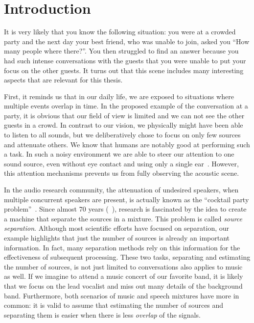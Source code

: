 \chapter{Introduction}\label{ch:introduction}

It is very likely that you know the following situation: you were at a crowded party and the next day your best friend, who was unable to join, asked you ``How many people where there?''. 
You then struggled to find an answer because you had such intense conversations with the guests that you were unable to put your focus on the other guests.
It turns out that this scene includes many interesting aspects that are relevant for this thesis.
\par
First, it reminds us that in our daily life, we are exposed to situations where multiple events overlap in time.
In the proposed example of the conversation at a party, it is obvious that our field of view is limited and we can not see the other guests in a crowd.
In contrast to our vision, we physically might have been able to listen to all sounds, but we deliberatively chose to focus on only few sources and attenuate others.
We know that humans are notably good at performing such a task.
In such a noisy environment we are able to steer our attention to one sound source, even without eye contact and using only a single ear~\cite{bregman90}.
However, this attention mechanisms prevents us from fully observing the acoustic scene.
\par
In the audio research community, the attenuation of undesired speakers, when multiple concurrent speakers are present, is actually known as the ``cocktail party problem''~\cite{haykin05}.
Since almost 70 years (~\cite{cherry53}), research is fascinated by the idea to create a machine that separate the sources in a mixture.
This problem is called \emph{source separation}.
Although most scientific efforts have focused on separation, our example highlights that just the number of sources is already an important information.
In fact, many separation methods rely on this information for the effectiveness of subsequent processing.
These two tasks, separating and estimating the number of sources, is not just limited to conversations also applies to music as well.
If we imagine to attend a music concert of our favorite band, it is likely that we focus on the lead vocalist and miss out many details of the background band.
Furthermore, both scenarios of music and speech mixtures have more in common: it is valid to assume that estimating the number of sources and separating them is easier when there is less \emph{overlap} of the signals.
